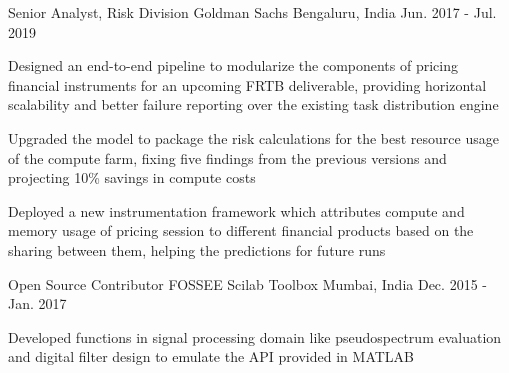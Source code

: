 

\begin{cventries}

  \cventry
    {Senior Analyst, Risk Division} %
    {Goldman Sachs} %
    {Bengaluru, India} %
    {Jun. 2017 - Jul. 2019} %
    {
      \begin{cvitems} %
        \item {Designed an end-to-end pipeline to modularize the components of pricing financial instruments for an upcoming FRTB deliverable, providing horizontal scalability and better failure reporting over the existing task distribution engine}
        \item {Upgraded the model to package the risk calculations for the best resource usage of the compute farm, fixing five findings from the previous versions and projecting 10\% savings in compute costs}
        \item {Deployed a new instrumentation framework which attributes compute and memory usage of pricing session to different financial products based on the sharing between them, helping the predictions for future runs}
      \end{cvitems}
    }

  \cventry
    {Open Source Contributor} %
    {FOSSEE Scilab Toolbox} %
    {Mumbai, India} %
    {Dec. 2015 - Jan. 2017} %
    {
      \begin{cvitems} %
        \item {Developed functions in signal processing domain like pseudospectrum evaluation and digital filter design to emulate the API provided in MATLAB}
      \end{cvitems}
    }


\end{cventries}
